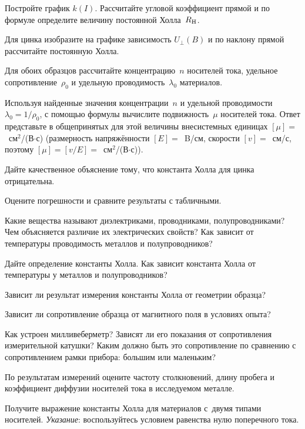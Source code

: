 \begin{lab:task}
\item Постройте график $k(I)$. Рассчитайте угловой коэффициент прямой 
и по формуле  определите величину постоянной Холла~$R_{\rm H}$.

\item Для цинка изобразите на графике зависимость $U_{\perp}(B)$ и по наклону 
прямой рассчитайте постоянную Холла.

\item Для обоих образцов рассчитайте концентрацию~$n$ носителей тока,
удельное сопротивление~$\rho_0$ и удельную проводимость~$\lambda_0$ материалов.

\item Используя найденные значения концентрации~$n$ и удельной проводимости
$\lambda_0=1/\rho_0$, с помощью формулы  вычислите 
подвижность~$\mu$ носителей тока. Ответ представьте в общепринятых для этой величины 
внесистемных единицах $[\mu]=$~см$^2$/(В$\cdot$с)
(размерность напряжённости $[E]=$~B/см, скорости $[v]=$~см/с,
поэтому $[\mu]=[v/E]=$~см$^2$/(В$\cdot$с)).

\item Дайте качественное объяснение тому, что константа Холла для
цинка отрицательна.

\item Оцените погрешности и сравните результаты с табличными.

\end{lab:task}



\begin{lab:questions}

\item Какие вещества называют диэлектриками, проводниками, полупроводниками?
Чем объясняется различие их электрических свойств? Как зависит от температуры
проводимость металлов и полупроводников?

\item Дайте определение константы Холла. Как зависит константа Холла от
температуры у металлов и полупроводников?

\item Зависит ли результат измерения константы Холла от геометрии образца?

\item Зависит ли сопротивление образца от магнитного поля 
в условиях опыта?

\item Как устроен милливеберметр? Зависят ли его показания от сопротивления
измерительной катушки? Каким должно быть это сопротивление по сравнению с
сопротивлением рамки прибора: большим или маленьким?

\item По результатам измерений оцените частоту столкновений,
длину пробега и коэффициент диффузии носителей тока в исследуемом металле.

\item Получите выражение константы Холла для материалов с~двумя типами
носителей. \emph{Указание}: воспользуйтесь условием равенства нулю поперечного тока.

\end{lab:questions}

